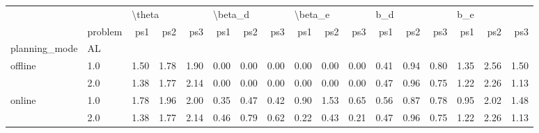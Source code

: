 \begin{tabular}{llrrrrrrrrrrrrrrr}
\toprule
       & {} & \multicolumn{3}{l}{\textbackslash theta} & \multicolumn{3}{l}{\textbackslash beta\_d} & \multicolumn{3}{l}{\textbackslash beta\_e} & \multicolumn{3}{l}{b\_d} & \multicolumn{3}{l}{b\_e} \\
       & problem &    ps1 &  ps2 &  ps3 &     ps1 &  ps2 &  ps3 &     ps1 &  ps2 &  ps3 &  ps1 &  ps2 &  ps3 &  ps1 &  ps2 &  ps3 \\
planning\_mode & AL &        &      &      &         &      &      &         &      &      &      &      &      &      &      &      \\
\midrule
offline & 1.0 &   1.50 & 1.78 & 1.90 &    0.00 & 0.00 & 0.00 &    0.00 & 0.00 & 0.00 & 0.41 & 0.94 & 0.80 & 1.35 & 2.56 & 1.50 \\
       & 2.0 &   1.38 & 1.77 & 2.14 &    0.00 & 0.00 & 0.00 &    0.00 & 0.00 & 0.00 & 0.47 & 0.96 & 0.75 & 1.22 & 2.26 & 1.13 \\
online & 1.0 &   1.78 & 1.96 & 2.00 &    0.35 & 0.47 & 0.42 &    0.90 & 1.53 & 0.65 & 0.56 & 0.87 & 0.78 & 0.95 & 2.02 & 1.48 \\
       & 2.0 &   1.38 & 1.77 & 2.14 &    0.46 & 0.79 & 0.62 &    0.22 & 0.43 & 0.21 & 0.47 & 0.96 & 0.75 & 1.22 & 2.26 & 1.13 \\
\bottomrule
\end{tabular}
